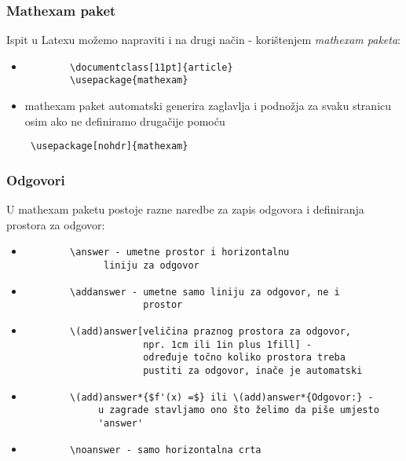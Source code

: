 \documentclass{beamer}
\begin{document}
\begin{frame}[fragile]
\frametitle{Mathexam paket}
Ispit u Latexu možemo napraviti i na drugi način - korištenjem \emph{mathexam paketa}:
\begin{itemize}
	\item
		\begin{verbatim}
		\documentclass[11pt]{article}
		\usepackage{mathexam}
		\end{verbatim}
	\item
		mathexam paket automatski generira zaglavlja i podnožja za svaku stranicu osim ako ne definiramo drugačije pomoću \begin{verbatim} \usepackage[nohdr]{mathexam} \end{verbatim} 
\end{itemize}
\end{frame}

\begin{frame}[fragile]
\frametitle{Odgovori}
U mathexam paketu postoje razne naredbe za zapis odgovora i definiranja prostora za odgovor:
\begin{itemize}
	\item
		\begin{verbatim}
		\answer - umetne prostor i horizontalnu 
	          liniju za odgovor
		\end{verbatim}
	\item
		\begin{verbatim}
		\addanswer - umetne samo liniju za odgovor, ne i 
		             prostor
		\end{verbatim}
	\item
		\begin{verbatim}
		\(add)answer[veličina praznog prostora za odgovor, 
		             npr. 1cm ili 1in plus 1fill] - 
		             određuje točno koliko prostora treba 
		             pustiti za odgovor, inače je automatski
		\end{verbatim}
	\item	
		\begin{verbatim}
		\(add)answer*{$f'(x) =$} ili \(add)answer*{Odgovor:} - 
		     u zagrade stavljamo ono što želimo da piše umjesto 
		     'answer'
		\end{verbatim}
	\item
		\begin{verbatim}
		\noanswer - samo horizontalna crta
		\end{verbatim}
\end{itemize}

\end{frame}
\end{document}
